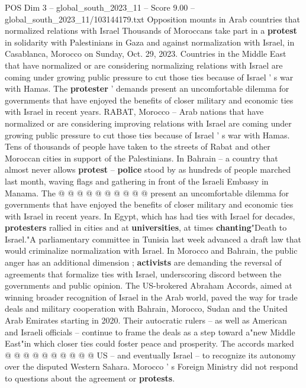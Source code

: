 \begin{textsample}{POS Dim 3 – global\_south\_2023\_11 – Score 9.00 – global\_south\_2023\_11/103144179.txt}  \label{ex:f3_pos_374}
Opposition mounts in Arab countries that normalized relations with Israel Thousands of Moroccans take part in a \textbf{protest} in solidarity with Palestinians in Gaza and against normalization with Israel, in Casablanca, Morocco on Sunday, Oct. 29, 2023.
Countries in the Middle East that have normalized or are considering normalizing relations with Israel are coming under growing public pressure to cut those ties because of Israel ' s war with Hamas.
The \textbf{protester} ' demands present an uncomfortable dilemma for governments that have enjoyed the benefits of closer military and economic ties with Israel in recent years.
RABAT, Morocco -- Arab nations that have normalized or are considering improving relations with Israel are coming under growing public pressure to cut those ties because of Israel ' s war with Hamas.
Tens of thousands of people have taken to the streets of Rabat and other Moroccan cities in support of the Palestinians.
In Bahrain -- a country that almost never allows \textbf{protest} -- \textbf{police} stood by as hundreds of people marched last month, waving flags and gathering in front of the Israeli Embassy in Manama.
The @ @ @ @ @ @ @ @ @ @ present an uncomfortable dilemma for governments that have enjoyed the benefits of closer military and economic ties with Israel in recent years.
In Egypt, which has had ties with Israel for decades, \textbf{protesters} rallied in cities and at \textbf{universities}, at times \textbf{chanting}"Death to Israel."A parliamentary committee in Tunisia last week advanced a draft law that would criminalize normalization with Israel.
In Morocco and Bahrain, the public anger has an additional dimension ; \textbf{activists} are demanding the reversal of agreements that formalize ties with Israel, underscoring discord between the governments and public opinion.
The US-brokered Abraham Accords, aimed at winning broader recognition of Israel in the Arab world, paved the way for trade deals and military cooperation with Bahrain, Morocco, Sudan and the United Arab Emirates starting in 2020.
Their autocratic rulers -- as well as American and Israeli officials -- continue to frame the deals as a step toward a"new Middle East"in which closer ties could foster peace and prosperity.
The accords marked @ @ @ @ @ @ @ @ @ @ US -- and eventually Israel -- to recognize its autonomy over the disputed Western Sahara.
Morocco ' s Foreign Ministry did not respond to questions about the agreement or \textbf{protests}.

\end{textsample}
